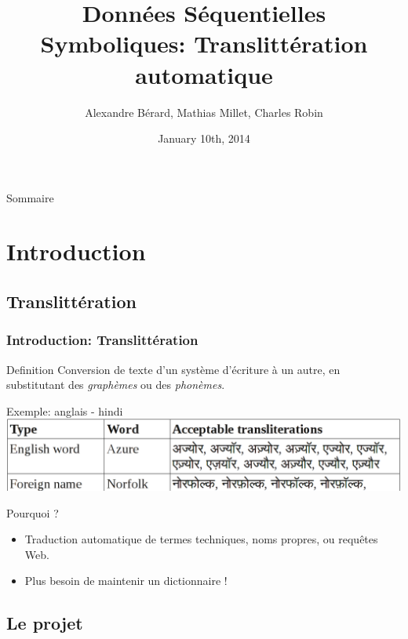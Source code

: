 \documentclass{beamer}
\title[Translittération automatique]{Données Séquentielles Symboliques: Translittération automatique}
\author[A.~Bérard, M.~Millet, C.~Robin]{Alexandre Bérard, Mathias Millet, Charles Robin}
\date{January 10th, 2014}
\begin{document}
\begin{frame}
\titlepage
\end{frame}

\begin{frame}{Sommaire}
  \tableofcontents
\end{frame}

\section{Introduction}   
 
\subsection{Translittération}
\begin{frame}
    \frametitle{Introduction: Translittération}
	\begin{block}{Definition}
        Conversion de texte d'un système d'écriture à un autre, en substitutant des \emph{graphèmes} ou des \emph{phonèmes}.
    \end{block}	    
    
	\begin{exampleblock}{Exemple: anglais - hindi}
	\includegraphics[scale=0.2]{en-in-example}
    \end{exampleblock}
    
	\begin{block}{Pourquoi ?}
	\begin{itemize}
		\item Traduction automatique de termes techniques, noms propres, ou requêtes Web.
		\item Plus besoin de maintenir un dictionnaire !
	\end{itemize}
	\end{block}	    
\end{frame}

\subsection{Le projet}
\end{document}
